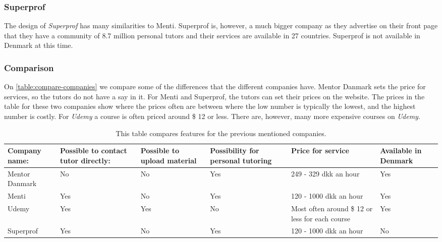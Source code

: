 \subsubsection{Superprof}
The design of \textit{Superprof} has many similarities to Menti.
Superprof is, however, a much bigger company as they advertise on their front page that they have a community of 8.7 million personal tutors \cite{superprof} and their services are available in 27 countries.
Superprof is not available in Denmark at this time.

\subsubsection{Comparison}
On \autoref{table:compare-companies} we compare some of the differences that the different companies have.
Mentor Danmark sets the price for services, so the tutors do not have a say in it.
For Menti and Superprof, the tutors can set their prices on the website. 
The prices in the table for these two companies show where the prices often are between where the low number is typically the lowest, and the highest number is costly.
For \textit{Udemy} a course is often priced around \$ 12 or less. 
There are, however, many more expensive courses on \textit{Udemy}.

\begin{table}[h]
    \begin{tabular}{|p{2cm}|p{2cm}|p{2cm}|p{2cm}|p{2cm}|p{2cm}|}
    \hline
    Company name:  & Possible to contact tutor directly: & Possible to upload material & Possibility for personal tutoring & Price for service                               & Available in Denmark \\ \hline
    Mentor Danmark & No                                  & No                          & Yes                               & 249 - 329 dkk an hour                           & Yes                  \\ \hline
    Menti          & Yes                                 & No                          & Yes                               & 120 - 1000 dkk an hour                          & Yes                  \\ \hline
    Udemy          & Yes                                 & Yes                         & No                                & Most often around \$ 12 or less for each course & Yes                  \\ \hline
    Superprof      & Yes                                 & No                          & Yes                               & 120 - 1000 dkk an hour                          & No                   \\ \hline
    \end{tabular}
    \caption{This table compares features for the previous mentioned companies.}
    \label{table:compare-companies}
\end{table}
 
